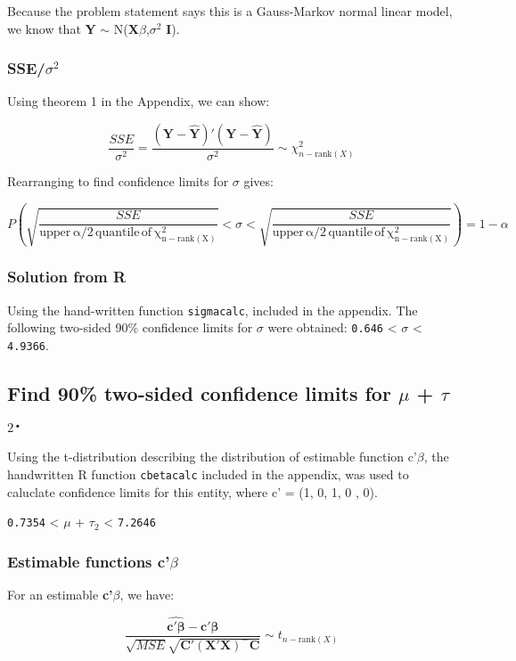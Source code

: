 \documentclass[11pt]{article}
\begin{document}
Because the problem statement says this is a Gauss-Markov normal
linear model, we know that \textbf{Y} $\sim$ N(\textbf{X$\beta$},$\sigma$$^2$ \textbf{I}).
\subsubsection{SSE/$\sigma$$^2$}
\label{sec-1-1-1}


Using theorem 1 in the Appendix, we can show:

$$\frac{SSE}{\sigma^2} = \frac{(\mathbf{Y} -
\hat{\mathbf{Y}})'(\mathbf{Y} - \hat{\mathbf{Y}})}{\sigma^2} \sim
\chi^2_{n-\text{rank}(X)}$$

Rearranging to find confidence limits for $\sigma$ gives:

$$P\left(\sqrt{\frac{SSE}{\mathrm{upper\, \alpha/2\, quantile\, of\,
\chi^2_{n-\mathrm{rank}(X)}}}} < \sigma < \sqrt{\frac{SSE}{\mathrm{upper\, \alpha/2\, quantile\, of\, \chi^2_{n-\mathrm{rank}(X)}}}} \right)
= 1 - \alpha$$
\subsubsection{Solution from R}
\label{sec-1-1-2}

Using the hand-written function \verb~sigmacalc~, included in the
appendix. The following two-sided 90\% confidence limits for $\sigma$ 
were obtained: \texttt{0.646} <
$\sigma$ < \texttt{4.9366}.
\subsection{Find 90\% two-sided confidence limits for $\mu$ + $\tau$$_2$.}
\label{sec-1-2}


Using the t-distribution describing the distribution of estimable
function c'$\beta$, the handwritten R function \verb~cbetacalc~ included in
the appendix, was used to caluclate confidence limits for this
entity, where c' = (1, 0, 1, 0 , 0).

\texttt{0.7354} 
< $\mu$ + $\tau$$_2$ <
\texttt{7.2646}
\subsubsection{Estimable functions \textbf{c'$\beta$}}
\label{sec-1-2-1}


For an estimable \textbf{c'$\beta$}, we have:

$$\frac{\widehat{\mathbf{c'\beta}} -
\mathbf{c'\beta}}{\sqrt{MSE}\sqrt{\mathbf{C'(X'X)^{-}C}}} \sim
t_{n-\mathrm{rank}(X)}$$
\end{document}
